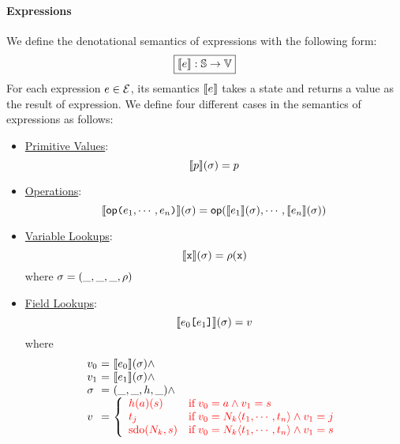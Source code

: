 \paragraph{Expressions} We define the denotational semantics of expressions with
the following form:
\[
  \framebox{$\sem{\expr}: \stset \rightarrow \valset$}
\]
For each expression $e \in \mathcal{E}$, its semantics $\llbracket{e}\rrbracket$ takes a
state and returns a value as the result of expression. We define four different
cases in the semantics of expressions as
follows:
\begin{itemize}
  \item \underline{Primitive Values}:
    \[
      \llbracket{p}\rrbracket(\sigma) = p
    \]

  \item \underline{Operations}:
    \[
      \sem{\op \kwrl \expr_1, \cdots, \expr_n \kwrr}(\st) =
      \op(\sem{\expr_1}(\st), \cdots, \sem{\expr_n}(\st))
    \]

  \item \underline{Variable Lookups}:
    \[
      \sem{\varx}(\st) = \env(\varx)
    \]
    where $\sigma = (\_, \_, \_, \rho)$

  \item \underline{Field Lookups}:
    \[
      \sem{\expr_0 \kwsl \expr_1 \kwsr}(\st) = \val
    \]
    where
    \[
      \begin{array}{l@{~}c@{~}ll}
        \val_0 &=& \sem{\expr_0}(\st) \wedge\\
        \val_1 &=& \sem{\expr_1}(\st) \wedge\\
        \st &=& (\_, \_, \heap, \_) \wedge\\
        \val &=& \left\{
          \inred{
          \begin{array}{ll}
            \heap(\addr)(\str)
            & \text{if} \; \val_0 = \addr \wedge \val_1 = \str\\

            \tree_j
            & \text{if} \; \val_0 = \nt_k \langle \tree_1, \cdots, \tree_n
            \rangle \wedge \val_1 = j\\

            \text{sdo}(\nt_k, \str)
            & \text{if} \; \val_0 = \nt_k \langle \tree_1, \cdots, \tree_n
            \rangle \wedge \val_1 = \str\\
          \end{array}
          }
        \right.\\
      \end{array}
    \]
\end{itemize}

